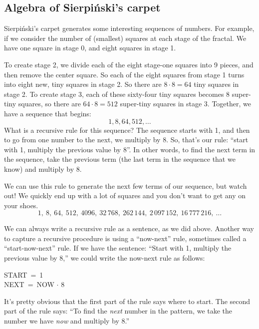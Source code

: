 \subsection{Algebra of {S}ierpi\'nski's carpet}

Sierpi\'nski's carpet generates some interesting sequences of numbers. For example, if we consider the number of (smallest) squares at each stage of the fractal. We have one square in stage 0, and eight squares in stage 1.

To create stage 2, we divide each of the eight stage-one squares into 9 pieces, and then remove the center square. So each of the eight squares from stage 1 turns into eight new, tiny squares in stage 2. So there are $8\cdot8 = 64$ tiny squares in stage 2. To create stage 3, each of these sixty-four tiny squares becomes 8 super-tiny squares, so there are $64 \cdot 8 = 512$ super-tiny squares in stage 3. Together, we have a sequence that begins:
\[1, 8, 64, 512, \dotsc\]
What is a recursive rule for this sequence? The sequence starts with 1, and then to go from one number to the next, we multiply by 8. So, that's our rule: ``start with 1, multiply the previous value by 8''. In other words, to find the next term in the sequence, take the previous term (the last term in the sequence that we know) and multiply by 8.

We can use this rule to generate the next few terms of our sequence, but watch out! We quickly end up with a lot of squares and you don't want to get any on your shoes. \[1,~ 8,~ 64,~ 512,~ 4096,~ 32\,768,~ 262\,144,~ 2\,097\,152,~ 16\,777\,216,~ \dotsc\]

We can always write a recursive rule as a sentence, as we did above. Another way to capture a recursive procedure is using a ``now-next'' rule, sometimes called a ``start-now-next'' rule. If we have the sentence: ``Start with 1, multiply the previous value by 8,'' we could write the now-next rule as follows:

\begin{center}
START~=~1 \\
NEXT~=~NOW $\cdot$ 8
\end{center}

It's pretty obvious that the first part of the rule says where to start. The second part of the rule says: ``To find the \textit{next} number in the pattern, we take the number we have \textit{now} and multiply by 8.''

